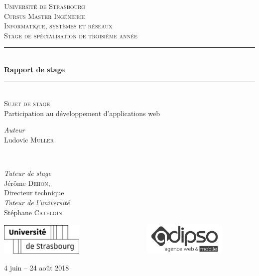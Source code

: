 \documentclass[]{article}
\begin{document}
\begin{titlepage}
	\newcommand{\HRule}{\rule{\linewidth}{0.5mm}}
	
	\center
	\textsc{\LARGE Université de Strasbourg}\\[1.5cm]
	\textsc{\Large Cursus Master Ingénierie \\ Informatique, systèmes et réseaux}\\[0.5cm]
	\textsc{\large Stage de spécialisation de troisième année}\\[0.5cm]
	
	\HRule\\[0.4cm]
	{\huge\bfseries Rapport de stage}\\[0.4cm]
	\HRule\\[1.5cm]

	\textsc{\large Sujet de stage}\\[0.5cm]
	Participation au développement d’applications web
	\vfill

	\begin{minipage}{0.4\textwidth}
		\begin{flushleft}
			\large
			\textit{Auteur}\\
			Ludovic \textsc{Muller}
		\end{flushleft}
	\end{minipage}
	~
	\begin{minipage}{0.4\textwidth}
		\begin{flushright}
			\large
			\textit{Tuteur de stage}\\
			Jérôme \textsc{Dehon},\\
      Directeur technique
			\vfill
			\textit{\\Tuteur de l'université}\\
			Stéphane \textsc{Cateloin}\\
		\end{flushright}
	\end{minipage}
    
	\vfill\vfill
	\includegraphics[width=0.3\textwidth]{../images/logos/unistra.png}
	\includegraphics[width=0.3\textwidth]{../images/logos/adipso.jpeg}
	\vfill
		
	\vfill\vfill
	
	4 juin – 24 août 2018
	
\end{titlepage}
\end{document}
